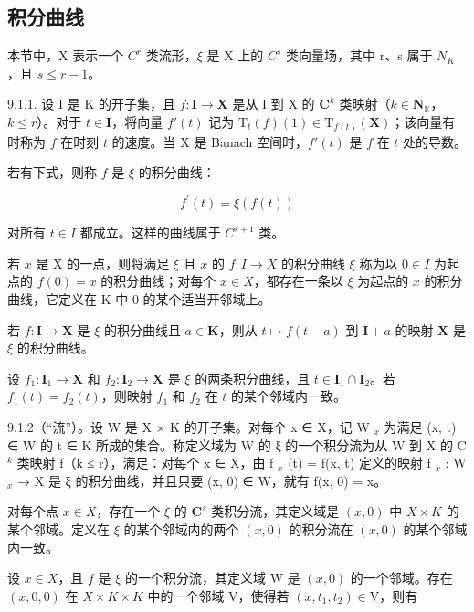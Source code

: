 \subsection{积分曲线}

本节中，X 表示一个 \(C^{r}\) 类流形，\(\xi\) 是 X 上的 \(C^{s}\) 类向量场，其中 r、s 属于 \(N_{K}\)，且 \(s \leqslant r - 1\)。

9.1.1. 设 I 是 K 的开子集，且 \(f: \mathbf{I} \to \mathbf{X}\) 是从 I 到 X 的 \(\mathbf{C}^k\) 类映射（\(k \in \mathbf{N}_{\mathbb{K}}\)，\(k \leqslant r\)）。对于 \(t \in \mathbf{I}\)，将向量 \(f'(t)\) 记为 \(\mathrm{T}_t(f)(1) \in \mathrm{T}_{f(t)}(\mathbf{X})\)；该向量有时称为 \(f\) 在时刻 \(t\) 的速度。当 X 是 Banach 空间时，\(f'(t)\) 是 \(f\) 在 \(t\) 处的导数。

若有下式，则称 \(f\) 是 \(\xi\) 的积分曲线：

\[
f ^ {\prime} (t) = \xi (f (t))\tag{1}
\]

对所有 \(t \in I\) 都成立。这样的曲线属于 \(C^{s+1}\) 类。

若 \(x\) 是 X 的一点，则将满足 \(\xi\) 且 \(x\) 的 \(f: I \to X\) 的积分曲线 \(\xi\) 称为以 \(0 \in I\) 为起点的 \(f(0) = x\) 的积分曲线；对每个 \(x \in X\)，都存在一条以 \(\xi\) 为起点的 \(x\) 的积分曲线，它定义在 K 中 0 的某个适当开邻域上。

若 \(f: \mathbf{I} \to \mathbf{X}\) 是 \(\xi\) 的积分曲线且 \(a \in \mathbf{K}\)，则从 \(t \mapsto f(t - a)\) 到 \(\mathbf{I} + a\) 的映射 \(\mathbf{X}\) 是 \(\xi\) 的积分曲线。

设 \(f_{1}\colon\mathbf{I}_{1}\to\mathbf{X}\) 和 \(f_{2}\colon\mathbf{I}_{2}\to\mathbf{X}\) 是 \(\xi\) 的两条积分曲线，且 \(t\in\mathbf{I}_{1}\cap\mathbf{I}_{2}\)。若 \(f_{1}(t)=f_{2}(t)\)，则映射 \(f_{1}\) 和 \(f_{2}\) 在 \(t\) 的某个邻域内一致。

9.1.2（“流”）。设 W 是 X × K 的开子集。对每个 x ∈ X，记 W \(_{x}\) 为满足 (x, t) ∈ W 的 t ∈ K 所成的集合。称定义域为 W 的 ξ 的一个积分流为从 W 到 X 的 C \(^{k}\) 类映射 f（k ≤ r），满足：对每个 x ∈ X，由 f \(_{x}\) (t) = f(x, t) 定义的映射 f \(_{x}\) : W \(_{x}\) → X 是 ξ 的积分曲线，并且只要 (x, 0) ∈ W，就有 f(x, 0) = x。

对每个点 \(x \in X\)，存在一个 \(\xi\) 的 \(\mathbf{C}^s\) 类积分流，其定义域是 \((x, 0)\) 中 \(X \times K\) 的某个邻域。定义在 \(\xi\) 的某个邻域内的两个 \((x, 0)\) 的积分流在 \((x, 0)\) 的某个邻域内一致。

设 \(x\in X\)，且 \(f\) 是 \(\xi\) 的一个积分流，其定义域 W 是 \((x,0)\) 的一个邻域。存在 \((x,0,0)\) 在 \(X \times K \times K\) 中的一个邻域 V，使得若 \((x,t_{1},t_{2})\in\mathrm{V}\)，则有

